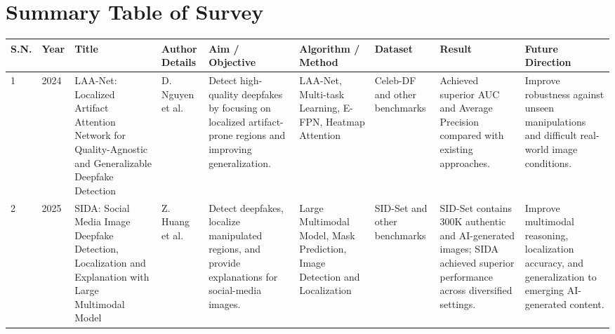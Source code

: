 \documentclass[12pt,a4paper,oneside]{report}
\begin{document}
\section{Summary Table of Survey}

\renewcommand{\arraystretch}{1.20}
\setlength{\tabcolsep}{2pt}

\begin{longtable}{|
>{\raggedright\arraybackslash}p{0.55cm}|
>{\raggedright\arraybackslash}p{0.65cm}|
>{\raggedright\arraybackslash}p{2.30cm}|
>{\raggedright\arraybackslash}p{1.55cm}|
>{\raggedright\arraybackslash}p{2.05cm}|
>{\raggedright\arraybackslash}p{1.80cm}|
>{\raggedright\arraybackslash}p{1.50cm}|
>{\raggedright\arraybackslash}p{1.90cm}|
>{\raggedright\arraybackslash}p{2.00cm}|
}
\hline

\scriptsize\textbf{S.N.} &
\scriptsize\textbf{Year} &
\scriptsize\textbf{Title} &
\scriptsize\textbf{Author Details} &
\scriptsize\textbf{Aim / Objective} &
\scriptsize\textbf{Algorithm / Method} &
\scriptsize\textbf{Dataset} &
\scriptsize\textbf{Result} &
\scriptsize\textbf{Future Direction}
\\
\hline

\scriptsize
1 &
\scriptsize
2024 &
\scriptsize
LAA-Net: Localized Artifact Attention Network for Quality-Agnostic and Generalizable Deepfake Detection &
\scriptsize
D. Nguyen et al. &
\scriptsize
Detect high-quality deepfakes by focusing on localized artifact-prone regions and improving generalization. &
\scriptsize
LAA-Net, Multi-task Learning, E-FPN, Heatmap Attention &
\scriptsize
Celeb-DF and other benchmarks &
\scriptsize
Achieved superior AUC and Average Precision compared with existing approaches. &
\scriptsize
Improve robustness against unseen manipulations and difficult real-world image conditions.
\\
\hline

\scriptsize
2 &
\scriptsize
2025 &
\scriptsize
SIDA: Social Media Image Deepfake Detection, Localization and Explanation with Large Multimodal Model &
\scriptsize
Z. Huang et al. &
\scriptsize
Detect deepfakes, localize manipulated regions, and provide explanations for social-media images. &
\scriptsize
Large Multimodal Model, Mask Prediction, Image Detection and Localization &
\scriptsize
SID-Set and other benchmarks &
\scriptsize
SID-Set contains 300K authentic and AI-generated images; SIDA achieved superior performance across diversified settings. &
\scriptsize
Improve multimodal reasoning, localization accuracy, and generalization to emerging AI-generated content.
\\
\hline


\end{longtable}
\end{document}
